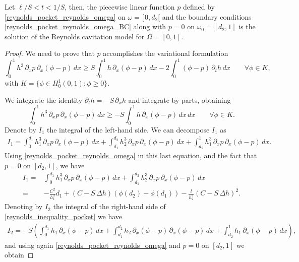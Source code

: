 \begin{proposition}
Let $\ell/S<t<1/S$, then, the piecewise linear function $p$ defined by \eqref{reynolds_pocket_reynolds_omega} on $\omega=\,]0,d_2[$ and the boundary conditions \eqref*{reynolds_pocket_reynolds_omega_BC} along with $p=0$ on $\omega_0=[d_2,1]$ is the solution of the Reynolds cavitation model for $\Omega=[0,1]$.
\begin{proof}
We need to prove that $p$ accomplishes the variational formulation
\begin{equation*}
\int_0^1 h^3\,\partial_x p \,\partial_x(\phi-p) \,dx
\geq S\int_0^1 h\, \partial_x(\phi-p)\,dx-2 \int_0^1 (\phi-p)\, \partial_t h\,dx \qquad \forall \phi\in K,
\end{equation*}
with $K=\{\phi \in H_0^1\left(0,1\right):\phi\geq 0\}$.

We integrate the identity $\partial_t h=-S\,\partial_x h$ and integrate by parts, obtaining
\begin{equation}
\int_0^1 h^3\,\partial_x p \,\partial_x(\phi-p) \,dx
\geq -S\int_0^1 h\,\partial_x(\phi-p)\,dx\,dx \qquad \forall \phi\in K.\label{eq:reynolds_inequality_pocket}
\end{equation}
Denote by $I_1$ the integral of the left-hand side. We can decompose $I_1$ as
\begin{align*}
I_1=\int_0^{d_1} h_1^3\,\partial_x p \,\partial_x(\phi-p) \,dx+\int_{d_1}^{d_2} h_2^3\,\partial_x p \,\partial_x(\phi-p) \,dx+\int_{d_2}^{1} h_1^3\,\partial_x p \,\partial_x(\phi-p)\,dx.
\end{align*}
Using \eqref*{reynolds_pocket_reynolds_omega} in this last equation, and the fact that $p=0$ on $[d_2,1]$, we have \begin{align}
I_1=&\int_0^{d_1} h_1^3\,\partial_x p \,\partial_x(\phi-p) \,dx+\int_{d_1}^{d_2} h_2^3\,\partial_x p \,\partial_x(\phi-p) \,dx\nonumber\\
=&-\frac{C^2}{h_1^3}d_1+\left(C-S\,\Delta h\right)\left(\phi(d_2)-\phi(d_1)\right)-\frac{l}{h_2^3}\left(C-S\,\Delta h\right)^2.\label{eq:aux_I1}
\end{align}
Denoting by $I_2$ the integral of the right-hand side of \eqref{reynolds_inequality_pocket} we have
\begin{align*}
I_2=-S\left(\int_0^{d_1} h_1\,\partial_x(\phi-p) \,dx+\int_{d_1}^{d_2} h_2\,\partial_x(\phi-p) \,\partial_x(\phi-p) \,dx+\int_{d_2}^{1} h_1\,\partial_x(\phi-p)\,dx\right),
\end{align*}
and using again \eqref*{reynolds_pocket_reynolds_omega} and $p=0$ on $[d_2,1]$ we obtain

\end{proof}
\end{proposition}
